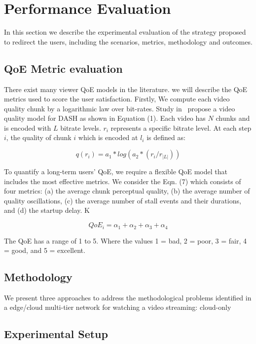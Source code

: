 \section{Performance Evaluation}
\label{sec:results}

In this section we describe the experimental evaluation of the strategy proposed to redirect the users, including the scenarios, metrics, methodology and outcomes.


\subsection{QoE Metric evaluation}

There exist many viewer QoE models in the literature. we will describe the QoE metrics used to score the user satisfaction. Firstly, We compute each video quality chunk by a logarithmic law over bit-rates. Study in~ propose a video quality model for DASH as shown in Equation (1). Each video has $N$ chunks and is encoded with $L$ bitrate levels. $r_i$ represents a specific bitrate level. At each step $i$, the quality of chunk $i$ which is encoded at $l_i$ is defined as:

$$
q(r_i) = a_1 * log(a_2 * (r_i/ r_{|L|}))
$$

To quantify a long-term users' QoE, we require a flexible QoE model that includes the most effective metrics. 
We consider the Eqn. (7) which consists of four metrics: (a) the average chunk perceptual quality, (b) the average number of quality oscillations, (c) the average number of stall events and their durations, and (d) the startup delay. K

\begin{equation}\label{qoe-equation}
QoE_i = \alpha_1 + \alpha_2 + \alpha_3 + \alpha_4
\end{equation}


The QoE has a range of 1 to 5. Where the values 1 = bad, 2 = poor, 3 = fair, 4 = good, and 5 = excellent.
 
 
\subsection{Methodology}

We present three approaches to address the methodological problems identified in a edge/cloud multi-tier network for watching a video streaming: cloud-only 

\subsection{Experimental Setup}

